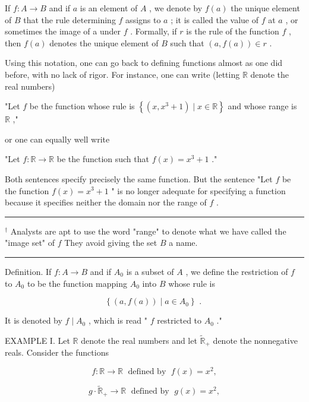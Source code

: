 \documentclass[10pt]{article}
\newcommand{\HRule}{\begin{center}\rule{0.9\linewidth}{0.2mm}\end{center}}
\begin{document}
If \(f : A \rightarrow  B\) and if \(a\) is an element of \(A\) , we denote by \(f\left( a\right)\) the unique element of \(B\) that the rule determining \(f\) assigns to \(a\) ; it is called the value of \(f\) at \(a\) , or sometimes the image of a under \(f\) . Formally, if \(r\) is the rule of the function \(f\) , then \(f\left( a\right)\) denotes the unique element of \(B\) such that \(\left( {a,f\left( a\right) }\right)  \in  r\) .

Using this notation, one can go back to defining functions almost as one did before, with no lack of rigor. For instance, one can write (letting \(\mathbb{R}\) denote the real numbers)

"Let \(f\) be the function whose rule is \(\left\{  {\left( {x,{x}^{3} + 1}\right)  \mid  x \in  \mathbb{R}}\right\}\) and whose range is \(\mathbb{R}\) ,"

or one can equally well write

"Let \(f : \mathbb{R} \rightarrow  \mathbb{R}\) be the function such that \(f\left( x\right)  = {x}^{3} + 1\) ."

Both sentences specify precisely the same function. But the sentence "Let \(f\) be the function \(f\left( x\right)  = {x}^{3} + 1\) " is no longer adequate for specifying a function because it specifies neither the domain nor the range of \(f\) .

\HRule

\({}^{ \dagger  }\) Analysts are apt to use the word "range" to denote what we have called the "image set" of \(f\) They avoid giving the set \(B\) a name.

\HRule

Definition. If \(f : A \rightarrow  B\) and if \({A}_{0}\) is a subset of \(A\) , we define the restriction of \(f\) to \({A}_{0}\) to be the function mapping \({A}_{0}\) into \(B\) whose rule is

\[
\left\{  {\left( {a,f\left( a\right) }\right)  \mid  a \in  {A}_{0}}\right\}  \text{ . }
\]

It is denoted by \(f \mid  {A}_{0}\) , which is read " \(f\) restricted to \({A}_{0}\) ."

EXAMPLE I. Let \(\mathbb{R}\) denote the real numbers and let \({\widetilde{\mathbb{R}}}_{ + }\) denote the nonnegative reals. Consider the functions

\[
f : \mathbb{R} \rightarrow  \mathbb{R}\;\text{ defined by }\;f\left( x\right)  = {x}^{2},
\]

\[
g \cdot  {\widetilde{\mathbb{R}}}_{ + } \rightarrow  \mathbb{R}\;\text{ defined by }\;g\left( x\right)  = {x}^{2},
\]
\end{document}
